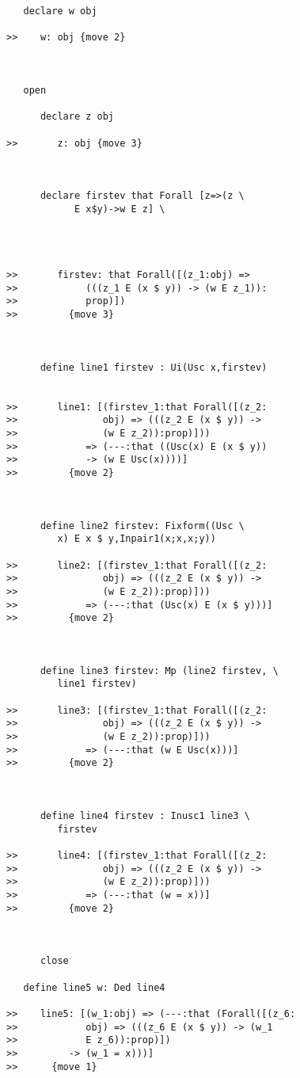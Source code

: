 \documentclass[12pt]{article}
\begin{document}
\begin{verbatim}
   declare w obj

>>    w: obj {move 2}



   open

      declare z obj

>>       z: obj {move 3}



      declare firstev that Forall [z=>(z \
            E x$y)->w E z] \
         



>>       firstev: that Forall([(z_1:obj) =>
>>            (((z_1 E (x $ y)) -> (w E z_1)):
>>            prop)])
>>         {move 3}



      define line1 firstev : Ui(Usc x,firstev)


>>       line1: [(firstev_1:that Forall([(z_2:
>>               obj) => (((z_2 E (x $ y)) ->
>>               (w E z_2)):prop)]))
>>            => (---:that ((Usc(x) E (x $ y))
>>            -> (w E Usc(x))))]
>>         {move 2}



      define line2 firstev: Fixform((Usc \
         x) E x $ y,Inpair1(x;x,x;y))

>>       line2: [(firstev_1:that Forall([(z_2:
>>               obj) => (((z_2 E (x $ y)) ->
>>               (w E z_2)):prop)]))
>>            => (---:that (Usc(x) E (x $ y)))]
>>         {move 2}



      define line3 firstev: Mp (line2 firstev, \
         line1 firstev)

>>       line3: [(firstev_1:that Forall([(z_2:
>>               obj) => (((z_2 E (x $ y)) ->
>>               (w E z_2)):prop)]))
>>            => (---:that (w E Usc(x)))]
>>         {move 2}



      define line4 firstev : Inusc1 line3 \
         firstev

>>       line4: [(firstev_1:that Forall([(z_2:
>>               obj) => (((z_2 E (x $ y)) ->
>>               (w E z_2)):prop)]))
>>            => (---:that (w = x))]
>>         {move 2}



      close

   define line5 w: Ded line4

>>    line5: [(w_1:obj) => (---:that (Forall([(z_6:
>>            obj) => (((z_6 E (x $ y)) -> (w_1
>>            E z_6)):prop)])
>>         -> (w_1 = x)))]
>>      {move 1}




\end{verbatim}
\end{document}
